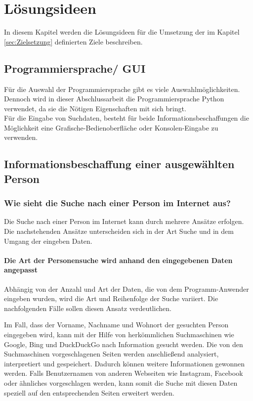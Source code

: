 
\chapter{Lösungsideen}  %
\label{cha:Lösungsideen} %
In diesem Kapitel werden die Lösungsideen für die Umsetzung der im Kapitel \ref{sec:Zielsetzung} definierten Ziele beschreiben.

\section{Programmiersprache/ GUI}
Für die Auswahl der Programmiersprache gibt es viele Auswahlmöglichkeiten. Dennoch wird in dieser Abschlussarbeit die Programmiersprache Python verwendet, da sie die Nötigen Eigenschaften mit sich bringt.\\
Für die Eingabe von Suchdaten, besteht für beide Informationsbeschaffungen die Möglichkeit eine Grafische-Bedienoberfläche oder Konsolen-Eingabe zu verwenden.
\section{Informationsbeschaffung einer ausgewählten Person}	
	\subsection{Wie sieht die Suche nach einer Person im Internet aus?}
	\label{sec:Suche nach Information}
	Die Suche nach einer Person im Internet kann durch mehrere Ansätze erfolgen. Die nachstehenden Ansätze unterscheiden sich in der Art Suche und in dem Umgang der eingeben Daten.
		\subsubsection{Die Art der Personensuche wird anhand den eingegebenen Daten angepasst}
		\label{subsubsec: DieArtderPersonensuchewirdanhanddeneingegebenenDaten angepasst}
		Abhängig von der Anzahl und Art der Daten, die von dem Programm-Anwender eingeben wurden, wird die Art und Reihenfolge der Suche variiert. Die nachfolgenden Fälle sollen diesen Ansatz verdeutlichen.
		
		Im Fall, dass der Vorname, Nachname und Wohnort der gesuchten Person eingegeben wird, kann mit der Hilfe von herkömmlichen Suchmaschinen wie Google, Bing und DuckDuckGo nach Information gesucht werden. Die von den Suchmaschinen vorgeschlagenen Seiten werden anschließend analysiert, interpretiert und gespeichert. Dadurch können weitere Informationen gewonnen werden. Falls Benutzernamen von anderen Webseiten wie Instagram, Facebook oder ähnliches vorgeschlagen werden, kann somit die Suche mit diesen Daten speziell auf den entsprechenden Seiten erweitert werden.
		
